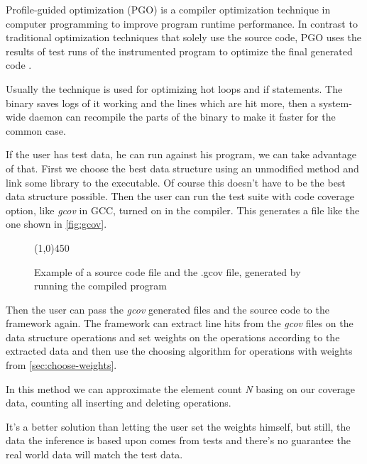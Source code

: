 \documentclass[a4paper,11pt]{article}
\begin{document}
			Profile-guided optimization (PGO) is a compiler optimization technique in computer programming
			to improve program runtime performance.  In contrast to traditional optimization techniques that
			solely use the source code, PGO uses the results of test runs of the instrumented program to
            optimize the final generated code \cite{Wipgo}.

            Usually the technique is used for optimizing hot loops and if statements. The binary saves logs of it
            working and the lines which are hit more, then a system-wide daemon can recompile the parts of the binary to
            make it faster for the common case.

			If the user has test data, he can run against his program, we can take advantage of that.  First
			we choose the best data structure using an unmodified method and link some library to the
			executable. Of course this doesn't have to be the best data structure possible. Then the user can run the test suite with code coverage option, like \emph{gcov} in GCC, turned on in the compiler. This
			generates a file like the one shown in \autoref{fig:gcov}.

			\begin{figure} \label{fig:gcov}
				

				\centering \line(1,0){450}

				

				\caption{Example of a source code file and the .gcov file, generated by running the
				compiled program}

				\label{fig:gcov}
			\end{figure}


			Then the user can pass the \emph{gcov} generated files and the source code to the framework
			again. The framework can extract line hits from the \emph{gcov} files on the data structure
			operations and set weights on the operations according to the extracted data and then use the
			choosing algorithm for operations with weights from \autoref{sec:choose-weights}.

            In this method we can approximate the element count \emph{N} basing on our coverage data, counting all inserting
            and deleting operations.

			It's a better solution than letting the user set the weights himself, but still, the data the
			inference is based upon comes from tests and there's no guarantee the real world data will
			match the test data.
\end{document}
